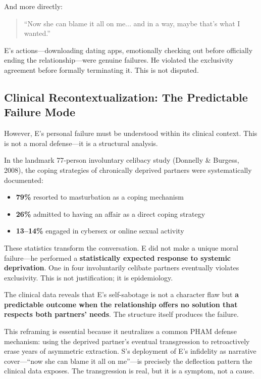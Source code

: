 \documentclass[12pt,openany]{book}
\numberwithin{equation}{chapter}
\begin{document}
And more directly:

\begin{quote}
``Now she can blame it all on me... and in a way, maybe that's what I wanted.''
\end{quote}

E's actions---downloading dating apps, emotionally checking out before officially ending the relationship---were genuine failures. He violated the exclusivity agreement before formally terminating it. This is not disputed.

\subsection{Clinical Recontextualization: The Predictable Failure Mode}

However, E's personal failure must be understood within its clinical context. This is not a moral defense---it is a structural analysis.

In the landmark 77-person involuntary celibacy study (Donnelly \& Burgess, 2008), the coping strategies of chronically deprived partners were systematically documented:

\begin{itemize}
    \item \textbf{79\%} resorted to masturbation as a coping mechanism
    \item \textbf{26\%} admitted to having an affair as a direct coping strategy
    \item \textbf{13--14\%} engaged in cybersex or online sexual activity
\end{itemize}

These statistics transform the conversation. E did not make a unique moral failure---he performed a \textbf{statistically expected response to systemic deprivation}. One in four involuntarily celibate partners eventually violates exclusivity. This is not justification; it is epidemiology.

The clinical data reveals that E's self-sabotage is not a character flaw but \textbf{a predictable outcome when the relationship offers no solution that respects both partners' needs}. The structure itself produces the failure.

This reframing is essential because it neutralizes a common PHAM defense mechanism: using the deprived partner's eventual transgression to retroactively erase years of asymmetric extraction. S's deployment of E's infidelity as narrative cover---``now she can blame it all on me''---is precisely the deflection pattern the clinical data exposes. The transgression is real, but it is a symptom, not a cause.
\end{document}
